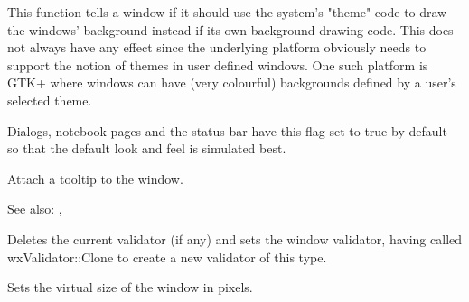 \label{wxwindowsetthemeenabled}


This function tells a window if it should use the system's "theme" code
to draw the windows' background instead if its own background drawing
code. This does not always have any effect since the underlying platform
obviously needs to support the notion of themes in user defined windows.
One such platform is GTK+ where windows can have (very colourful) backgrounds
defined by a user's selected theme.

Dialogs, notebook pages and the status bar have this flag set to true
by default so that the default look and feel is simulated best.


\label{wxwindowsettooltip}



Attach a tooltip to the window.

See also: ,


\label{wxwindowsetvalidator}


Deletes the current validator (if any) and sets the window validator, having called wxValidator::Clone to
create a new validator of this type.


\label{wxwindowsetvirtualsize}



Sets the virtual size of the window in pixels.


\label{wxwindowsetvirtualsizehints}




